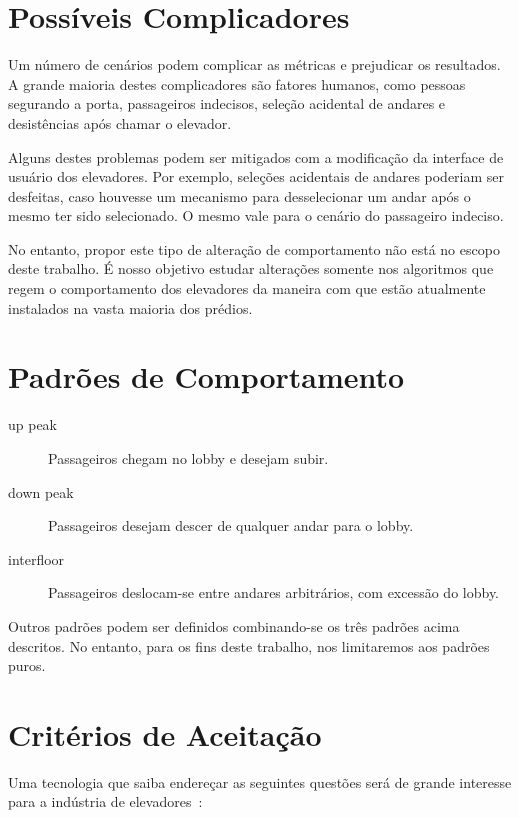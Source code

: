 \section{Possíveis Complicadores}

Um número de cenários podem complicar as métricas e prejudicar os resultados. A
grande maioria destes complicadores são fatores humanos, como pessoas segurando
a porta, passageiros indecisos, seleção acidental de andares e desistências após
chamar o elevador.

Alguns destes problemas podem ser mitigados com a modificação da interface de
usuário dos elevadores. Por exemplo, seleções acidentais de andares poderiam ser
desfeitas, caso houvesse um mecanismo para desselecionar um andar após o mesmo
ter sido selecionado. O mesmo vale para o cenário do passageiro indeciso.

No entanto, propor este tipo de alteração de comportamento não está no escopo
deste trabalho. É nosso objetivo estudar alterações somente nos algoritmos que
regem o comportamento dos elevadores da maneira com que estão atualmente
instalados na vasta maioria dos prédios.

\section{Padrões de Comportamento}

\begin{description}
\item[up peak] Passageiros chegam no lobby e desejam subir.
\item[down peak] Passageiros desejam descer de qualquer andar para o lobby.
\item[interfloor] Passageiros deslocam-se entre andares arbitrários, com
  excessão do lobby.
\end{description}

Outros padrões podem ser definidos combinando-se os três padrões acima
descritos. No entanto, para os fins deste trabalho, nos limitaremos aos padrões puros.

\section{Critérios de Aceitação}

Uma tecnologia que saiba endereçar as seguintes questões será de grande interesse para a indústria de elevadores~\cite{KOEHLEROTTIGER02}:

